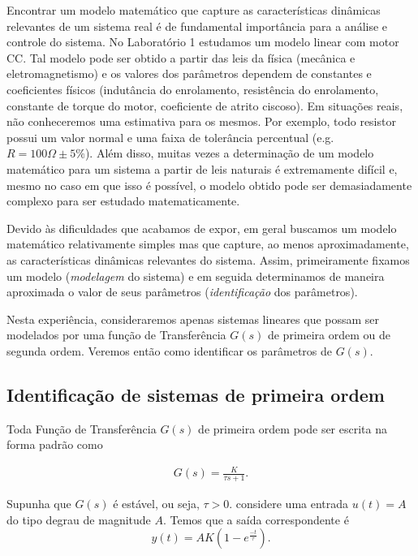 \documentclass[
]{book}
\begin{document}
Encontrar um modelo matemático que capture as características dinâmicas relevantes de um sistema real é de fundamental importância para a análise e controle do sistema. No Laboratório 1 estudamos um modelo linear com motor CC. Tal modelo pode ser obtido a partir das leis da física (mecânica e eletromagnetismo) e os valores dos parâmetros dependem de constantes e coeficientes físicos (indutância do enrolamento, resistência do enrolamento, constante de torque do motor, coeficiente de atrito ciscoso). Em situações reais, não conheceremos uma estimativa para os mesmos. Por exemplo, todo resistor possui um valor normal e uma faixa de tolerância percentual (e.g.~\(R = 100 \Omega \pm 5\%\)). Além disso, muitas vezes a determinação de um modelo matemático para um sistema a partir de leis naturais é extremamente difícil e, mesmo no caso em que isso é possível, o modelo obtido pode ser demasiadamente complexo para ser estudado matematicamente.

Devido às dificuldades que acabamos de expor, em geral buscamos um modelo matemático relativamente simples mas que capture, ao menos aproximadamente, as características dinâmicas relevantes do sistema. Assim, primeiramente fixamos um modelo (\emph{modelagem} do sistema) e em seguida determinamos de maneira aproximada o valor de seus parâmetros (\emph{identificação} dos parâmetros).

Nesta experiência, consideraremos apenas sistemas lineares que possam ser modelados por uma função de Transferência \(G(s)\) de primeira ordem ou de segunda ordem. Veremos então como identificar os parâmetros de \(G(s)\).

\hypertarget{identificauxe7uxe3o-de-sistemas-de-primeira-ordem}{%
\subsection{Identificação de sistemas de primeira ordem}\label{identificauxe7uxe3o-de-sistemas-de-primeira-ordem}}

Toda Função de Transferência \(G(s)\) de primeira ordem pode ser escrita na forma padrão como

\begin{align}
G(s) = \frac{K}{\tau s+1}. \label{eq:eq31}
\end{align}

Supunha que \(G(s)\) é estável, ou seja, \(\tau > 0\). considere uma entrada \(u(t) = A\) do tipo degrau de magnitude \(A\). Temos que a saída correspondente é
\[
y(t) = AK(1- e^{\frac {-t}{\tau}}).
\]
\end{document}
